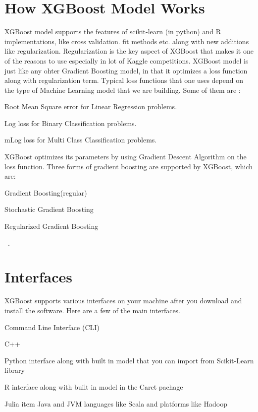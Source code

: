 \section{How XGBoost Model Works}

XGBoost model supports the features of scikit-learn (in python) and R
implementations, like cross validation. fit methods etc. along with new
additions like regularization.  Regularization is the key aspect of XGBoost that
makes it one of the reasons to use especially in  lot of Kaggle competitions.
XGBoost model is just like any ohter Gradient Boosting model, in that it
optimizes a loss function  along with regularization term. Typical loss
functions that one uses depend on the type of Machine Learning model that we are
building. Some of them are :

\item Root Mean Square error for Linear Regression problems. 
\item Log loss for Binary Classification problems. 
\item mLog loss for Multi Class Classification problems.

XGBoost optimizes its parameters by using Gradient Descent Algorithm on the loss
function. Three forms of gradient boosting are supported by XGBoost, which are:

\item Gradient Boosting(regular)
\item Stochastic Gradient Boosting
\item Regularized Gradient Boosting 

~\cite{hid-sp18-401-XGBoost-MLmastery}.


\section{Interfaces}

XGBoost supports various interfaces on your machine after you download and
install the software. Here are a few of the main interfaces.

\item Command Line Interface (CLI)  
\item C++  
\item Python interface along with built in model that you can import 
from Scikit-Learn library   
\item R interface along with built in model in the Caret pachage  
\item Julia item Java and JVM languages like Scala and platforms like Hadoop

